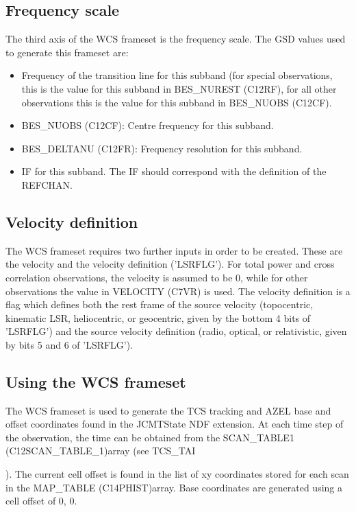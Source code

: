 \documentclass[twoside,11pt,nolof]{starlink}
\providecommand{\velocity}{VELOCITY (C7VR)}
\providecommand{\scanTableA}{SCAN\_TABLE1 (C12SCAN\_TABLE\_1)}
\providecommand{\mapTable}{MAP\_TABLE (C14PHIST)}
\providecommand{\centreFreqs}{BES\_NUOBS (C12CF)}
\providecommand{\restFreqs}{BES\_NUREST (C12RF)}
\providecommand{\freqRes}{BES\_DELTANU (C12FR)}
\begin{document}
\subsection{Frequency scale}

The third axis of the WCS frameset is the frequency scale.  The GSD values used to generate this frameset are:

\begin{itemize}
\item Frequency of the transition line for this subband (for special observations, this is the value for this subband in \restFreqs{}, for all other observations this is the value for this subband in \centreFreqs{}.
\item \centreFreqs{}: Centre frequency for this subband.
\item \freqRes{}: Frequency resolution for this subband.
\item IF for this subband.  The IF should correspond with the definition of the REFCHAN.
\end{itemize}

\subsection{Velocity definition}

The WCS frameset requires two further inputs in order to be created.  These are the velocity and the velocity definition ('LSRFLG').  For total power and cross correlation observations, the velocity is assumed to be 0, while for other observations the value in \velocity{} is used.  The velocity definition is a flag which defines both the rest frame of the source velocity (topocentric, kinematic LSR, heliocentric, or geocentric, given by the bottom 4 bits of 'LSRFLG') and the source velocity definition (radio, optical, or relativistic, given by bits 5 and 6 of 'LSRFLG').

\subsection{Using the WCS frameset}

The WCS frameset is used to generate the TCS tracking and AZEL base and offset coordinates found in the JCMTState NDF extension.
At each time step of the observation, the time can be obtained from the \scanTableA array (see TCS\_TAI


).  The current cell offset is found in the list of xy coordinates stored for each scan in the \mapTable array.  Base coordinates are generated using a cell offset of 0, 0.
\end{document}

